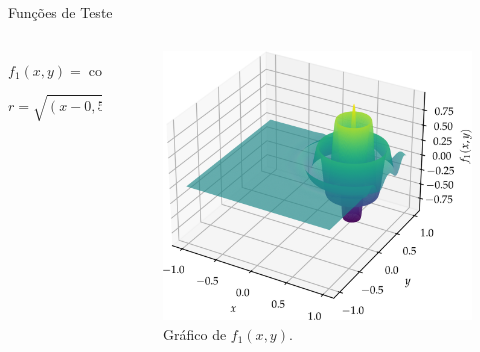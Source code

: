 \begin{frame}{Funções de Teste}
  \begin{columns}
    \begin{column}{0.5\textwidth}
      $$ f_1(x,y) = \cos(9\pi r)\exp\left\{-\frac{r^2}{(0,4)^2}\right\} $$
      $$ r = \sqrt{
          \left(x - 0,5\right)^2 +
          \left(y - 0,5\right)^2
        } $$
    \end{column}
    \begin{column}{0.5\textwidth}
      \begin{figure}
        \centering
        \includegraphics[width=\textwidth]{imagens/graph_damped_cossine.png}
        \caption{Gráfico de $f_1(x,y)$.}
      \end{figure}
    \end{column}
  \end{columns}
\end{frame}

